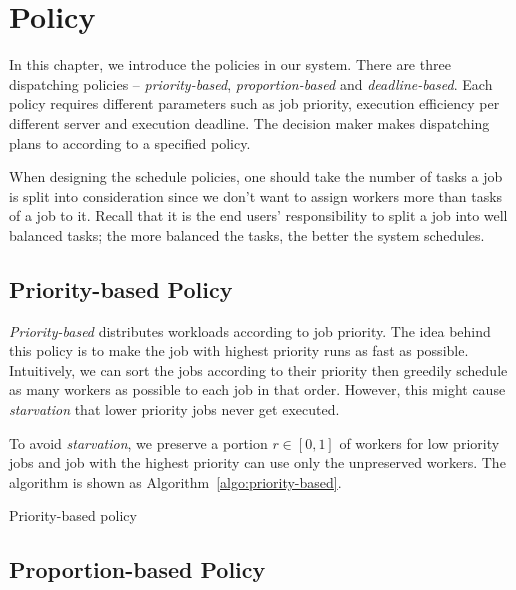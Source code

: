 \chapter{Policy}

In this chapter, we introduce the policies in our system.
There are three dispatching policies -- \emph{priority-based},
\emph{proportion-based} and \emph{deadline-based}.
Each policy requires different parameters such as job priority,
execution efficiency per different server and execution deadline.
The decision maker makes dispatching plans to according to a specified
policy.

When designing the schedule policies, one should take the number of
tasks a job is split into consideration since we don't want to assign
workers more than tasks of a job to it.
Recall that it is the end users' responsibility to split a job into well
balanced tasks; the more balanced the tasks, the better the system
schedules.


\section{Priority-based Policy}

\emph{Priority-based} distributes workloads according to job priority. 
The idea behind this policy is to make the job with highest priority runs as
fast as possible.
Intuitively, we can sort the jobs according to their priority then greedily
schedule as many workers as possible to each job in that order.
However, this might cause \emph{starvation} that lower priority jobs never get
executed.

To avoid \emph{starvation}, we preserve a portion $r \in [0,1]$ of workers for
low priority jobs and job with the highest priority can use only the
unpreserved workers.
The algorithm is shown as Algorithm~\ref{algo:priority-based}.

\begin{algorithm}[H]
  \DontPrintSemicolon %
  
  \caption{Priority-based policy}
  \label{algo:priority-based}
\end{algorithm}

\section{Proportion-based Policy}

